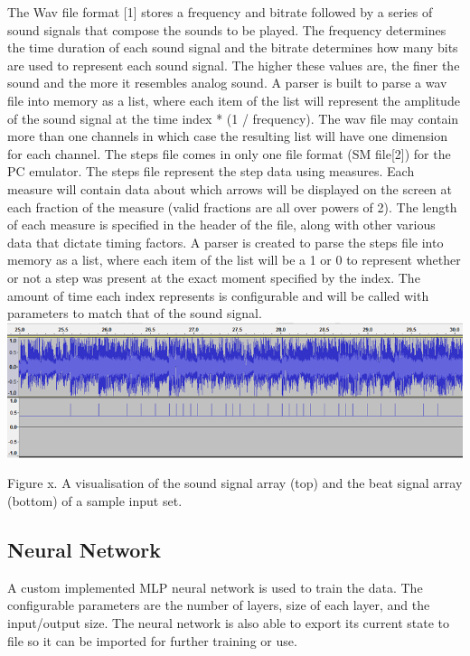 The Wav file format [1] stores a frequency and bitrate followed by a series of sound signals that compose the sounds to be played. The frequency determines the time duration of each sound signal and the bitrate determines how many bits are used to represent each sound signal. The higher these values are, the finer the sound and the more it resembles analog sound. A parser is built to parse a wav file into memory as a list, where each item of the list will represent the amplitude of the sound signal at the time index * (1 / frequency). The wav file may contain more than one channels in which case the resulting list will have one dimension for each channel.
The steps file comes in only one file format (SM file[2]) for the PC emulator. The steps file represent the step data using measures. Each measure will contain data about which arrows will be displayed on the screen at each fraction of the measure (valid fractions are all over powers of 2). The length of each measure is specified in the header of the file, along with other various data that dictate timing factors. A parser is created to parse the steps file into memory as a list, where each item of the list will be a 1 or 0 to represent whether or not a step was present at the exact moment specified by the index. The amount of time each index represents is configurable and will be called with parameters to match that of the sound signal.\\

\includegraphics[scale=0.55]{signal_1.png}

Figure x. A visualisation of the sound signal array (top) and the beat signal array (bottom) of a sample input set.


\subsection{Neural Network}
A custom implemented MLP neural network is used to train the data. The configurable parameters are the number of layers, size of each layer, and the input/output size. The neural network is also able to export its current state to file so it can be imported for further training or use.\\

